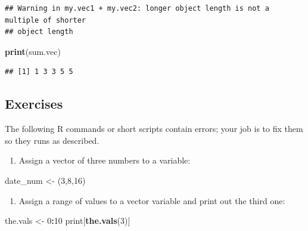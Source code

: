\documentclass[
]{book}
\newenvironment{Shaded}{\begin{snugshade}}{\end{snugshade}}
\newcommand{\DecValTok}[1]{\textcolor[rgb]{0.00,0.00,0.81}{#1}}
\newcommand{\KeywordTok}[1]{\textcolor[rgb]{0.13,0.29,0.53}{\textbf{#1}}}
\newcommand{\NormalTok}[1]{#1}
\newcommand{\OperatorTok}[1]{\textcolor[rgb]{0.81,0.36,0.00}{\textbf{#1}}}
\newcommand{\StringTok}[1]{\textcolor[rgb]{0.31,0.60,0.02}{#1}}
\providecommand{\tightlist}{%
  \setlength{\itemsep}{0pt}\setlength{\parskip}{0pt}}
\theoremstyle{definition}
\theoremstyle{definition}
\theoremstyle{definition}
\theoremstyle{remark}
\begin{document}
\begin{verbatim}
## Warning in my.vec1 + my.vec2: longer object length is not a multiple of shorter
## object length
\end{verbatim}

\begin{Shaded}
\begin{Highlighting}[]
\KeywordTok{print}\NormalTok{(sum.vec)}
\end{Highlighting}
\end{Shaded}

\begin{verbatim}
## [1] 1 3 3 5 5
\end{verbatim}

\hypertarget{exercises-4}{%
\subsection{Exercises}\label{exercises-4}}

The following R commands or short scripts contain errors; your job is to fix them so they runs as described.

\begin{enumerate}
\def\labelenumi{\arabic{enumi}.}
\tightlist
\item
  Assign a vector of three numbers to a variable:
\end{enumerate}

\begin{Shaded}
\begin{Highlighting}[]
\NormalTok{date\_num \textless{}{-}}\StringTok{ }\NormalTok{(}\DecValTok{3}\NormalTok{,}\DecValTok{8}\NormalTok{,}\DecValTok{16}\NormalTok{)}
\end{Highlighting}
\end{Shaded}

\begin{enumerate}
\def\labelenumi{\arabic{enumi}.}
\setcounter{enumi}{1}
\tightlist
\item
  Assign a range of values to a vector variable and print out the third one:
\end{enumerate}

\begin{Shaded}
\begin{Highlighting}[]
\NormalTok{the.vals \textless{}{-}}\StringTok{ }\DecValTok{0}\OperatorTok{:}\DecValTok{10}
\NormalTok{print[}\KeywordTok{the.vals}\NormalTok{(}\DecValTok{3}\NormalTok{)]}
\end{Highlighting}
\end{Shaded}
\end{document}

